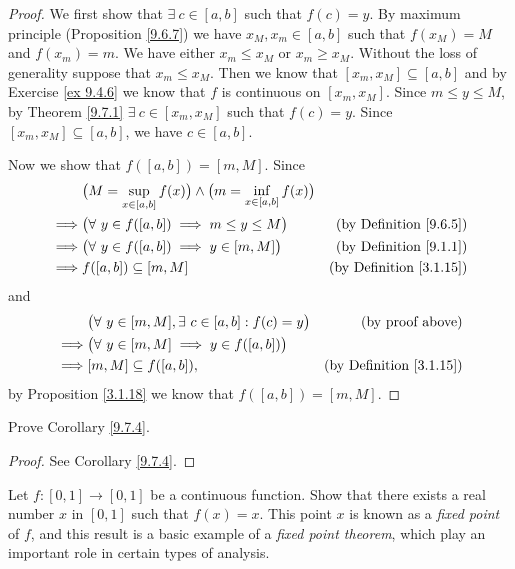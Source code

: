 \begin{proof}
    We first show that \(\exists\ c \in [a, b]\) such that \(f(c) = y\).
    By maximum principle (Proposition \ref{9.6.7}) we have \(x_M, x_m \in [a, b]\) such that \(f(x_M) = M\) and \(f(x_m) = m\).
    We have either \(x_m \leq x_M\) or \(x_m \geq x_M\).
    Without the loss of generality suppose that \(x_m \leq x_M\).
    Then we know that \([x_m, x_M] \subseteq [a, b]\) and by Exercise \ref{ex 9.4.6} we know that \(f\) is continuous on \([x_m, x_M]\).
    Since \(m \leq y \leq M\), by Theorem \ref{9.7.1} \(\exists\ c \in [x_m, x_M]\) such that \(f(c) = y\).
    Since \([x_m, x_M] \subseteq [a, b]\), we have \(c \in [a, b]\).

    Now we show that \(f([a, b]) = [m, M]\).
    Since
    \begin{align*}
        & \big(M = \sup_{x \in [a, b]} f(x)\big) \land \big(m = \inf_{x \in [a, b]} f(x)\big) \\
        \implies & \big(\forall\ y \in f([a, b]) \implies m \leq y \leq M\big) & \text{(by Definition \ref{9.6.5})} \\
        \implies & \big(\forall\ y \in f([a, b]) \implies y \in [m, M]\big) & \text{(by Definition \ref{9.1.1})} \\
        \implies & f([a, b]) \subseteq [m, M] & \text{(by Definition \ref{3.1.15})}
    \end{align*}
    and
    \begin{align*}
        & \big(\forall\ y \in [m, M], \exists\ c \in [a, b] : f(c) = y\big) & \text{(by proof above)} \\
        \implies & \big(\forall\ y \in [m, M] \implies y \in f([a, b])\big) \\
        \implies & [m, M] \subseteq f([a, b]), & \text{(by Definition \ref{3.1.15})}
    \end{align*}
    by Proposition \ref{3.1.18} we know that \(f([a, b]) = [m ,M]\).
\end{proof}

\exercisesection

\begin{exercise}\label{ex 9.7.1}
    Prove Corollary \ref{9.7.4}.
\end{exercise}

\begin{proof}
    See Corollary \ref{9.7.4}.
\end{proof}

\begin{exercise}\label{ex 9.7.2}
    Let \(f : [0, 1] \to [0, 1]\) be a continuous function.
    Show that there exists a real number \(x\) in \([0, 1]\) such that \(f(x) = x\).
    This point \(x\) is known as a \emph{fixed point} of \(f\), and this result is a basic example of a \emph{fixed point theorem}, which play an important role in certain types of analysis.
\end{exercise}


